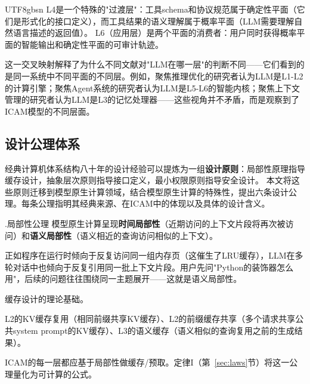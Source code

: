 \documentclass[11pt,a4paper]{article}
\newcounter{axiom}[section]
\renewcommand{\theaxiom}{\thesection.\arabic{axiom}}
\begin{document}
\begin{CJK*}{UTF8}{gbsn}
L4是一个特殊的"过渡层"：工具schema和协议规范属于确定性平面（它们是形式化的接口定义），而工具结果的语义理解属于概率平面（LLM需要理解自然语言描述的返回值）。
L6（应用层）是两个平面的消费者：用户同时获得概率平面的智能输出和确定性平面的可审计轨迹。

这一交叉映射解释了为什么不同文献对"LLM在哪一层"的判断不同——它们看到的是同一系统中不同平面的不同层。例如，聚焦推理优化的研究者认为LLM是L1-L2的计算引擎\cite{kwon2023pagedattention,zhou2024efficientinference}；聚焦Agent系统的研究者认为LLM是L5-L6的智能内核\cite{openai_codex_overview_2026,anthropic_claudecode_overview_2026}；聚焦上下文管理的研究者认为LLM是L3的记忆处理器\cite{memgpt2023,memoryos2025}——这些视角并不矛盾，而是观察到了ICAM模型的不同层面。

\subsection{设计公理体系}
\label{sec:icam-axioms}

经典计算机体系结构八十年的设计经验可以提炼为一组\textbf{设计原则}：局部性原理指导缓存设计，抽象层次原则指导接口定义，最小权限原则指导安全设计。
本文将这些原则迁移到模型原生计算领域，结合模型原生计算的特殊性，提出六条设计公理。每条公理指明其经典来源、在ICAM中的体现以及具体的设计含义。

\begin{axiombox}{\theaxiom\enspace 局部性公理}
模型原生计算呈现\textbf{时间局部性}（近期访问的上下文片段将再次被访问）和\textbf{语义局部性}（语义相近的查询访问相似的上下文）。
\end{axiombox}
\begin{description}[style=nextline,leftmargin=2em,font=\bfseries]
\item[直观解释] 正如程序在运行时倾向于反复访问同一组内存页（这催生了LRU缓存），LLM在多轮对话中也倾向于反复引用同一批上下文片段。用户先问"Python的装饰器怎么用"，后续的问题往往围绕同一主题展开——这就是语义局部性。
\item[经典来源] 缓存设计的理论基础\cite{drepper2007memory}。
\item[ICAM体现] L2的KV缓存复用（相同前缀共享KV缓存）、L2的前缀缓存共享（多个请求共享公共system prompt的KV缓存）、L3的语义缓存（语义相似的查询复用之前的生成结果）。
\item[设计含义] ICAM的每一层都应基于局部性做缓存/预取。定律I（第~\ref{sec:laws}节）将这一公理量化为可计算的公式。
\end{description}


\end{CJK*}
\end{document}
